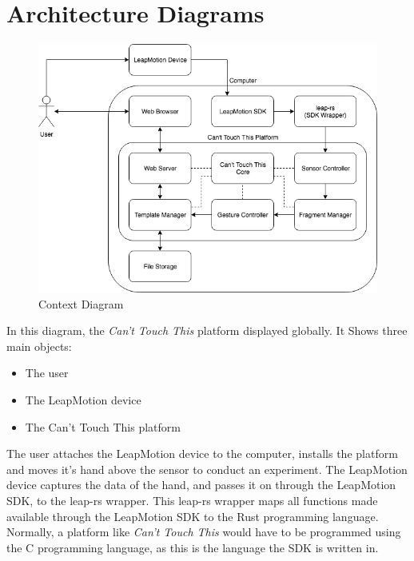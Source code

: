 \documentclass[a4paper]{article}
\providecommand{\tightlist}{%
\setlength{\itemsep}{0pt}\setlength{\parskip}{0pt}}
\begin{document}

  \section{Architecture Diagrams}
  \begin{figure}[h]
    \caption{Context Diagram}
    \centering
    \includegraphics[width=\linewidth]{context-diagram}
  \end{figure}
  In this diagram, the \textit{Can't Touch This} platform displayed globally. It
  Shows three main objects:
  \begin{itemize}
    \tightlist{}
    \item The user
    \item The LeapMotion device
    \item The Can't Touch This platform
  \end{itemize}
  The user attaches the LeapMotion device to the computer, installs the platform
  and moves it's hand above the sensor to conduct an experiment. The LeapMotion
  device captures the data of the hand, and passes it on through the LeapMotion
  SDK, to the leap-rs wrapper. This leap-rs wrapper maps all functions made
  available through the LeapMotion SDK to the Rust programming language.
  Normally, a platform like \textit{Can't Touch This} would have to be
  programmed using the C programming language, as this is the language the SDK
  is written in.
\end{document}
